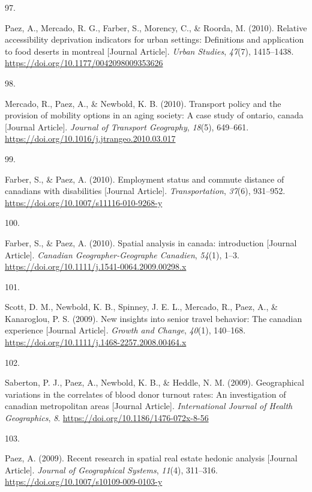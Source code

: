\documentclass[10pt,a4paper,]{twentysecondcv}
\newlength{\csllabelwidth}
\newcommand{\CSLLeftMargin}[1]{\parbox[t]{\csllabelwidth}{#1}}
\newcommand{\CSLRightInline}[1]{\parbox[t]{\linewidth - \csllabelwidth}{#1}}
\begin{document}
\leavevmode{}%
\CSLLeftMargin{97. }%
\CSLRightInline{Paez, A., Mercado, R. G., Farber, S., Morency, C., \&
Roorda, M. (2010). Relative accessibility deprivation indicators for
urban settings: Definitions and application to food deserts in montreal
{[}Journal Article{]}. \emph{Urban Studies}, \emph{47}(7), 1415--1438.
\url{https://doi.org/10.1177/0042098009353626}}

\leavevmode{}%
\CSLLeftMargin{98. }%
\CSLRightInline{Mercado, R., Paez, A., \& Newbold, K. B. (2010).
Transport policy and the provision of mobility options in an aging
society: A case study of ontario, canada {[}Journal Article{]}.
\emph{Journal of Transport Geography}, \emph{18}(5), 649--661.
\url{https://doi.org/10.1016/j.jtrangeo.2010.03.017}}

\leavevmode{}%
\CSLLeftMargin{99. }%
\CSLRightInline{Farber, S., \& Paez, A. (2010). Employment status and
commute distance of canadians with disabilities {[}Journal Article{]}.
\emph{Transportation}, \emph{37}(6), 931--952.
\url{https://doi.org/10.1007/s11116-010-9268-y}}

\leavevmode{}%
\CSLLeftMargin{100. }%
\CSLRightInline{Farber, S., \& Paez, A. (2010). Spatial analysis in
canada: introduction {[}Journal Article{]}. \emph{Canadian
Geographer-Geographe Canadien}, \emph{54}(1), 1--3.
\url{https://doi.org/10.1111/j.1541-0064.2009.00298.x}}

\leavevmode{}%
\CSLLeftMargin{101. }%
\CSLRightInline{Scott, D. M., Newbold, K. B., Spinney, J. E. L.,
Mercado, R., Paez, A., \& Kanaroglou, P. S. (2009). New insights into
senior travel behavior: The canadian experience {[}Journal Article{]}.
\emph{Growth and Change}, \emph{40}(1), 140--168.
\url{https://doi.org/10.1111/j.1468-2257.2008.00464.x}}

\leavevmode{}%
\CSLLeftMargin{102. }%
\CSLRightInline{Saberton, P. J., Paez, A., Newbold, K. B., \& Heddle, N.
M. (2009). Geographical variations in the correlates of blood donor
turnout rates: An investigation of canadian metropolitan areas
{[}Journal Article{]}. \emph{International Journal of Health
Geographics}, \emph{8}. \url{https://doi.org/10.1186/1476-072x-8-56}}

\leavevmode{}%
\CSLLeftMargin{103. }%
\CSLRightInline{Paez, A. (2009). Recent research in spatial real estate
hedonic analysis {[}Journal Article{]}. \emph{Journal of Geographical
Systems}, \emph{11}(4), 311--316.
\url{https://doi.org/10.1007/s10109-009-0103-y}}
\end{document}
